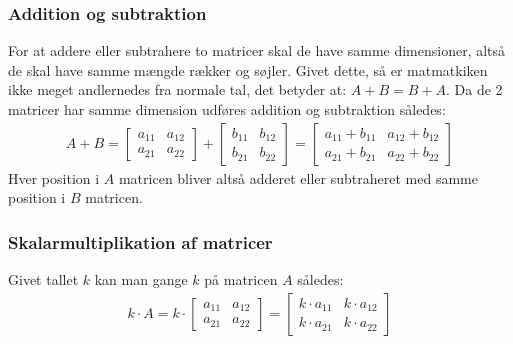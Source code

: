 \documentclass{article}
\begin{document}
\subsubsection{Addition og subtraktion}
For at addere eller subtrahere to matricer skal de have samme dimensioner, altså de skal have samme mængde rækker og søjler. Givet dette, så er matmatkiken ikke meget andlernedes fra normale tal, det betyder at: $A + B = B + A$. Da de 2 matricer har samme dimension udføres addition og subtraktion således:
\begin{align}
  A + B = \begin{bmatrix}
    a_{11} & a_{12} \\
    a_{21} & a_{22}
  \end{bmatrix} + \begin{bmatrix}
    b_{11} & b_{12} \\
    b_{21} & b_{22}
  \end{bmatrix} = \begin{bmatrix}
    a_{11} + b_{11} & a_{12} + b_{12} \\
    a_{21} + b_{21} & a_{22} + b_{22}
  \end{bmatrix}
\end{align}
Hver position i $A$ matricen bliver altså adderet eller subtraheret med samme position i $B$ matricen.
\subsubsection{Skalarmultiplikation af matricer}
Givet tallet $k$ kan man gange $k$ på matricen $A$ således:
\begin{align}
  k \cdot A = k \cdot \begin{bmatrix}
    a_{11} & a_{12} \\
    a_{21} & a_{22}
  \end{bmatrix} = \begin{bmatrix}
    k \cdot a_{11} & k \cdot a_{12} \\
    k \cdot a_{21} & k \cdot a_{22}
  \end{bmatrix}
\end{align}
\end{document}
